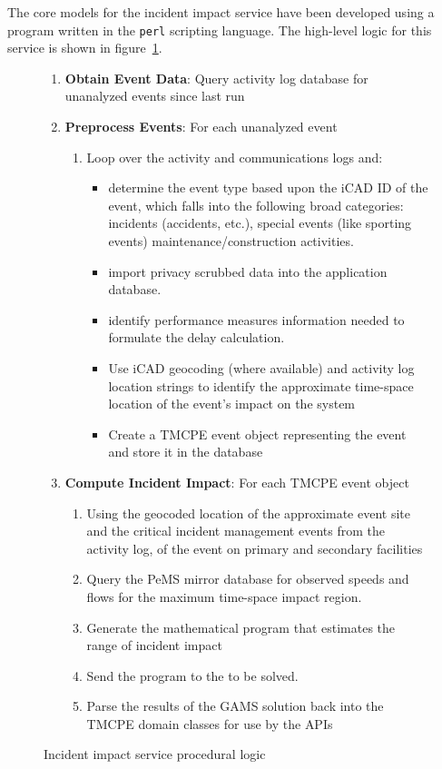 \documentclass[12pt]{report}
\newcounter{time}
\newcounter{space}
\begin{document}
The core models for the incident impact service have been developed using a
program written in the \texttt{perl} scripting language.  The high-level logic
for this service is shown in figure~\ref{fig:inc-imp-serv}.
\begin{figure}[t]
  \centering
  \begin{enumerate}
  \item {\sc \textbf{Obtain Event Data}}: Query activity log database
    for unanalyzed events since last run
  \item {\sc\textbf{Preprocess Events}}: For each unanalyzed event
    \begin{enumerate}
    \item Loop over the activity and communications logs and:
      \begin{itemize}
      \item determine the event type based upon the \ac{iCAD} ID of the event,
        which falls into the following broad categories: incidents (accidents,
        etc.), special events (like sporting events) 
        maintenance/construction activities.
      \item import privacy scrubbed data into the application database.
      \item identify performance measures information needed to
        formulate the delay calculation.
      \item Use \ac{iCAD} geocoding (where available) and activity log
        location strings to identify the approximate time-space
        location of the event's impact on the
        system
      \item Create a \ac{TMCPE} event object representing the event and
        store it in the database
      \end{itemize}
    \end{enumerate}
  \item {\sc\textbf{Compute Incident Impact}}: For each \ac{TMCPE} event object
    \begin{enumerate}
    \item Using the geocoded location of the approximate event site and
      the critical incident management events from the activity log,
       of the event on primary and secondary facilities
    \item Query the \ac{PeMS} mirror database for observed speeds and flows
      for the maximum time-space impact region.
    \item Generate the mathematical program that estimates the range
      of incident impact
    \item Send the program to the  to be solved.
    \item Parse the results of the GAMS solution back into the \ac{TMCPE}
      domain classes for use by the \acp{API}
    \end{enumerate}
  \end{enumerate}
  \caption{Incident impact service procedural logic}
  \label{fig:inc-imp-serv}
\end{figure}
\end{document}
